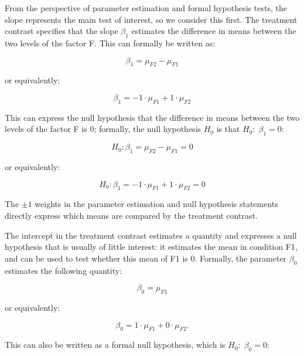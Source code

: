\documentclass[12pt,]{krantz}
\begin{document}
From the perspective of parameter estimation and formal hypothesis tests, the slope represents the main test of interest, so we consider this first. The treatment contrast specifies that the slope \(\beta_1\) estimates the difference in means between the two levels of the factor F. This can formally be written as:

\begin{equation}
\beta_1 = \mu_{F2} - \mu_{F1}
\end{equation}

or equivalently:

\begin{equation}
\beta_1 = - 1 \cdot \mu_{F1} + 1 \cdot \mu_{F2}
\end{equation}

This can express the null hypothesis that the difference in means between the two levels of the factor F is \(0\); formally, the null hypothesis \(H_0\) is that \(H_0: \; \beta_1 = 0\):

\begin{equation} \label{eq:f2minusf1}
H_0: \beta_1 = \mu_{F2} - \mu_{F1} = 0
\end{equation}

or equivalently:

\begin{equation}
H_0: \beta_1 = - 1 \cdot \mu_{F1} + 1 \cdot \mu_{F2} = 0
\end{equation}

The \(\pm 1\) weights in the parameter estimation and null hypothesis statements directly express which means are compared by the treatment contrast.

The intercept in the treatment contrast estimates a quantity and expresses a null hypothesis that is usually of little interest: it estimates the mean in condition F1, and can be used to test whether this mean of F1 is \(0\).
Formally, the parameter \(\beta_0\) estimates the following quantity:

\begin{equation}
\beta_0 = \mu_{F1}
\end{equation}

\noindent
or equivalently:

\begin{equation}
\beta_0 = 1 \cdot \mu_{F1} + 0 \cdot \mu_{F2} .
\end{equation}

This can also be written as a formal null hypothesis, which is \(H_0: \; \beta_0 = 0\):
\end{document}
